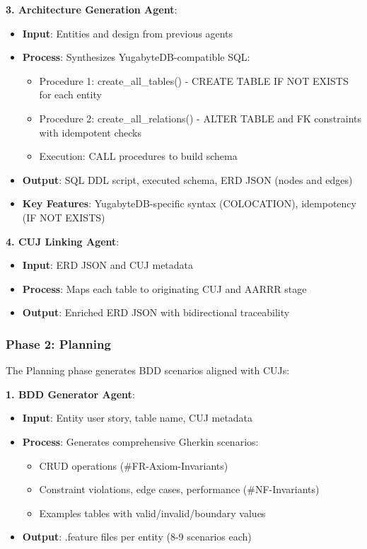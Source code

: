 \documentclass[12pt,a4paper]{article}
\begin{document}
\textbf{3. Architecture Generation Agent}:
\begin{itemize}
\item \textbf{Input}: Entities and design from previous agents
\item \textbf{Process}: Synthesizes YugabyteDB-compatible SQL:
\begin{itemize}
\item Procedure 1: create\_all\_tables() - CREATE TABLE IF NOT EXISTS for each entity
\item Procedure 2: create\_all\_relations() - ALTER TABLE and FK constraints with idempotent checks
\item Execution: CALL procedures to build schema
\end{itemize}
\item \textbf{Output}: SQL DDL script, executed schema, ERD JSON (nodes and edges)
\item \textbf{Key Features}: YugabyteDB-specific syntax (COLOCATION), idempotency (IF NOT EXISTS)
\end{itemize}

\textbf{4. CUJ Linking Agent}:
\begin{itemize}
\item \textbf{Input}: ERD JSON and CUJ metadata
\item \textbf{Process}: Maps each table to originating CUJ and AARRR stage
\item \textbf{Output}: Enriched ERD JSON with bidirectional traceability
\end{itemize}

\subsubsection{Phase 2: Planning}

The Planning phase generates BDD scenarios aligned with CUJs:

\textbf{1. BDD Generator Agent}:
\begin{itemize}
\item \textbf{Input}: Entity user story, table name, CUJ metadata
\item \textbf{Process}: Generates comprehensive Gherkin scenarios:
\begin{itemize}
\item CRUD operations (\#FR-Axiom-Invariants)
\item Constraint violations, edge cases, performance (\#NF-Invariants)
\item Examples tables with valid/invalid/boundary values
\end{itemize}
\item \textbf{Output}: .feature files per entity (8-9 scenarios each)
\end{itemize}
\end{document}
